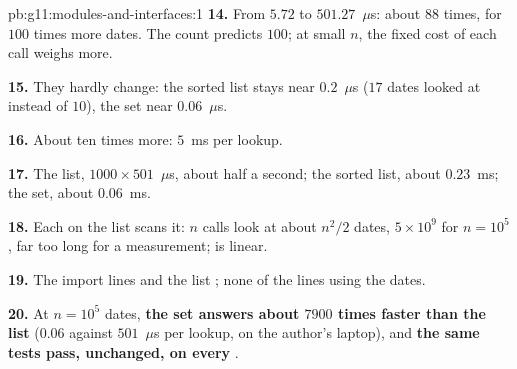 \begin{solution}{pb:g11:modules-and-interfaces:1}
\textbf{14.} From $5.72$ to $501.27$~$\mu$s: about $88$ times, for $100$ times more dates. The count predicts $100$;
at small $n$, the fixed cost of each call weighs more.

\textbf{15.} They hardly change: the sorted list stays near $0.2$~$\mu$s ($17$ dates looked at instead of $10$), the set
near $0.06$~$\mu$s.

\textbf{16.} About ten times more: $5$~ms per lookup.

\textbf{17.} The list, $1000 \times 501$~$\mu$s, about half a second; the sorted list, about $0.23$~ms; the set, about
$0.06$~ms.

\textbf{18.} Each  on the list scans it: $n$ calls look at about $n^2/2$ dates, $5 \times 10^9$ for $n =
10^5$, far too long for a measurement;  is linear.

\textbf{19.} The import lines and the list ; none of the lines using the dates.

\textbf{20.} At $n = 10^5$ dates, \textbf{the set answers  about $7900$ times faster than the list}
($0.06$ against $501$~$\mu$s per lookup, on the author's laptop), and \textbf{the same tests pass, unchanged, on every
}.
\end{solution}
